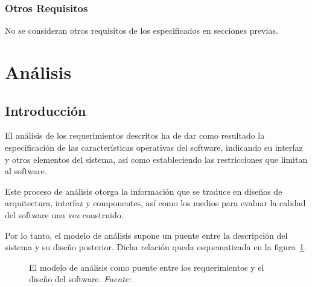 \subsubsection{Otros Requisitos}

No se consideran otros requisitos de los especificados en secciones previas.



\section{Análisis}
\label{sec:secModeloAn}

\subsection{Introducción}

El análisis de los requerimientos descritos ha de dar como resultado la especificación de las características operativas del software, indicando su interfaz y otros elementos del sistema, así como estableciendo las restricciones que limitan al software.

Este proceso de análisis otorga la información que se traduce en diseños de arquitectura, interfaz y componentes, así como los medios para evaluar la calidad del software una vez construido. 

Por lo tanto, el modelo de análisis supone un puente entre la descripción del sistema y su diseño posterior. Dicha relación queda esquematizada en la figura~\ref{fig:modeloAnalisis}.

\begin{figure}
	\centering
	\caption[El modelo de análisis como puente entre los requerimientos y el diseño del software]{El modelo de análisis como puente entre los requerimientos y el diseño del software. \textit{Fuente:~\cite{Pre10}}}
	\label{fig:modeloAnalisis}
\end{figure}

